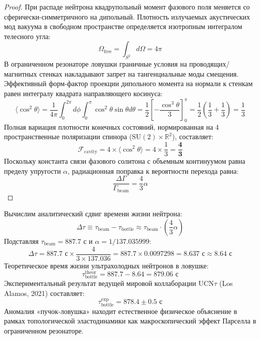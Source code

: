 \documentclass[12pt,a4paper]{article}
\begin{document}
\begin{proof}
	При распаде нейтрона квадрупольный момент фазового поля меняется со сферически-симметричного на дипольный. Плотность излучаемых акустических мод вакуума в свободном пространстве определяется изотропным интегралом телесного угла:
	\begin{equation}
		\Omega_{\text{free}} = \int_{S^2} d\Omega = 4\pi
	\end{equation}
	В ограниченном резонаторе ловушки граничные условия на проводящих/магнитных стенках накладывают запрет на тангенциальные моды смещения. Эффективный форм-фактор проекции дипольного момента на нормали к стенкам равен интегралу квадрата направляющего косинуса:
	\begin{equation}
		\langle \cos^2\theta \rangle = \frac{1}{4\pi} \int_0^{2\pi} d\phi \int_0^\pi \cos^2\theta \sin\theta d\theta = \frac{1}{2} \left[ -\frac{\cos^3\theta}{3} \right]_0^\pi = \frac{1}{2} \left( \frac{1}{3} + \frac{1}{3} \right) = \frac{1}{3}
	\end{equation}
	Полная вариация плотности конечных состояний, нормированная на 4 пространственные поляризации спинора ($\mathrm{SU}(2) \times \mathbb{R}^2$), составляет:
	\begin{equation}
		\mathcal{F}_{\text{cavity}} = 4 \times \langle \cos^2\theta \rangle = 4 \times \frac{1}{3} = \mathbf{\frac{4}{3}}
	\end{equation}
	Поскольку константа связи фазового солитона с объемным континуумом равна пределу упругости $\alpha$, радиационная поправка к вероятности перехода равна:
	\begin{equation}
		\frac{\Delta \Gamma}{\Gamma_{\text{beam}}} = \frac{4}{3} \alpha
	\end{equation}
\end{proof}

Вычислим аналитический сдвиг времени жизни нейтрона:
\begin{equation}
	\Delta \tau \equiv \tau_{\text{beam}} - \tau_{\text{bottle}} \approx \tau_{\text{beam}} \cdot \left( \frac{4}{3} \alpha \right)
\end{equation}
Подставляя $\tau_{\text{beam}} = 887.7$ с и $\alpha = 1/137.035999$:
\begin{equation}
	\Delta \tau = 887.7 \text{ с} \times \frac{4}{3 \times 137.036} = 887.7 \times 0.0097298 = \mathbf{8.637 \text{ с}} \approx \mathbf{8.64 \text{ с}}
\end{equation}
Теоретическое время жизни ультрахолодных нейтронов в ловушке:
\begin{equation}
	\tau_{\text{bottle}}^{\text{theor}} = 887.7 - 8.64 = \mathbf{879.06 \text{ с}}
\end{equation}
Экспериментальный результат ведущей мировой коллаборации $\text{UCN}\tau$ (Los Alamos, 2021) составляет:
\begin{equation}
	\tau_{\text{bottle}}^{\text{exp}} = \mathbf{878.4 \pm 0.5 \text{ с}}
\end{equation}
Аномалия «пучок-ловушка» находит естественное физическое объяснение в рамках топологической эластодинамики как макроскопический эффект Парселла в ограниченном резонаторе.
\end{document}

